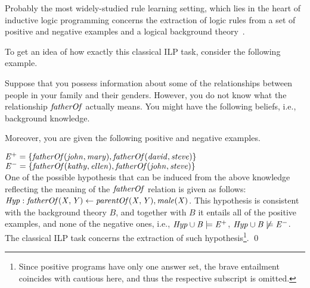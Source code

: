 Probably the most widely-studied rule learning setting, which lies in the heart of inductive logic programming concerns the extraction of logic rules from a set of positive and negative examples and a logical background theory~\cite{foil,golem,quickfoil}.

To get an idea of how exactly this classical ILP task, consider the following example.

\begin{example}
\label{ex:ilp}
Suppose that you possess information about some of the relationships between people in your family and their genders.
However, you do not know what the relationship $\mathit{fatherOf}$ actually means. 
You might have the following beliefs, i.e., background knowledge.
\smallskip

{}
\smallskip

Moreover, you are given the following positive and negative examples.
\smallskip

\noindent $\mathit{E^+=\{fatherOf(john, mary), fatherOf(david, steve)\}}$\\
$\mathit{E^-=\{fatherOf(kathy, ellen), fatherOf(john, steve)\}}$\\

One of the possible hypothesis that can be induced from the above knowledge reflecting the meaning of the $\mathit{fatherOf}$ relation is given as follows:\\
$\mathit{Hyp: fatherOf(X, Y)\leftarrow parentOf(X,Y), male(X)}$. This hypothesis is consistent with the background theory $B$, and together with $B$ it entails all of the positive examples, and none of the negative ones, i.e., $\mathit{Hyp \cup B \models E^+}$, $\mathit{Hyp \cup B \not \models E^-}$. The classical ILP task concerns the extraction of such hypothesis\footnote{Since positive programs have only one answer set, the brave entailment coincides with cautious here, and thus the respective subscript is omitted.}.  \qed
\end{example}

